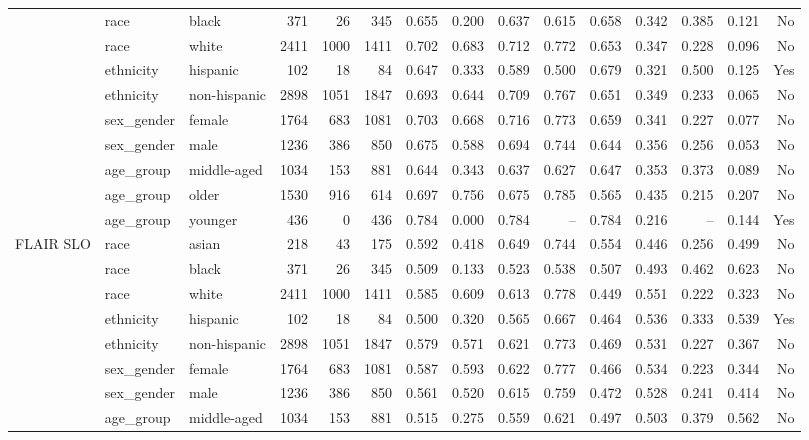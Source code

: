 \begin{longtable}{@{}lllrrrrrrrrrrrr@{}}
 & race & black & 371 & 26 & 345 & 0.655 & 0.200 & 0.637 & 0.615 & 0.658 & 0.342 & 0.385 & 0.121 & No \\
 & race & white & 2411 & 1000 & 1411 & 0.702 & 0.683 & 0.712 & 0.772 & 0.653 & 0.347 & 0.228 & 0.096 & No \\
 & ethnicity & hispanic & 102 & 18 & 84 & 0.647 & 0.333 & 0.589 & 0.500 & 0.679 & 0.321 & 0.500 & 0.125 & Yes \\
 & ethnicity & non-hispanic & 2898 & 1051 & 1847 & 0.693 & 0.644 & 0.709 & 0.767 & 0.651 & 0.349 & 0.233 & 0.065 & No \\
 & sex\_gender & female & 1764 & 683 & 1081 & 0.703 & 0.668 & 0.716 & 0.773 & 0.659 & 0.341 & 0.227 & 0.077 & No \\
 & sex\_gender & male & 1236 & 386 & 850 & 0.675 & 0.588 & 0.694 & 0.744 & 0.644 & 0.356 & 0.256 & 0.053 & No \\
 & age\_group & middle-aged & 1034 & 153 & 881 & 0.644 & 0.343 & 0.637 & 0.627 & 0.647 & 0.353 & 0.373 & 0.089 & No \\
 & age\_group & older & 1530 & 916 & 614 & 0.697 & 0.756 & 0.675 & 0.785 & 0.565 & 0.435 & 0.215 & 0.207 & No \\
 & age\_group & younger & 436 & 0 & 436 & 0.784 & 0.000 & 0.784 & -- & 0.784 & 0.216 & -- & 0.144 & Yes \\
FLAIR SLO & race & asian & 218 & 43 & 175 & 0.592 & 0.418 & 0.649 & 0.744 & 0.554 & 0.446 & 0.256 & 0.499 & No \\
 & race & black & 371 & 26 & 345 & 0.509 & 0.133 & 0.523 & 0.538 & 0.507 & 0.493 & 0.462 & 0.623 & No \\
 & race & white & 2411 & 1000 & 1411 & 0.585 & 0.609 & 0.613 & 0.778 & 0.449 & 0.551 & 0.222 & 0.323 & No \\
 & ethnicity & hispanic & 102 & 18 & 84 & 0.500 & 0.320 & 0.565 & 0.667 & 0.464 & 0.536 & 0.333 & 0.539 & Yes \\
 & ethnicity & non-hispanic & 2898 & 1051 & 1847 & 0.579 & 0.571 & 0.621 & 0.773 & 0.469 & 0.531 & 0.227 & 0.367 & No \\
 & sex\_gender & female & 1764 & 683 & 1081 & 0.587 & 0.593 & 0.622 & 0.777 & 0.466 & 0.534 & 0.223 & 0.344 & No \\
 & sex\_gender & male & 1236 & 386 & 850 & 0.561 & 0.520 & 0.615 & 0.759 & 0.472 & 0.528 & 0.241 & 0.414 & No \\
 & age\_group & middle-aged & 1034 & 153 & 881 & 0.515 & 0.275 & 0.559 & 0.621 & 0.497 & 0.503 & 0.379 & 0.562 & No \\

\end{longtable}
